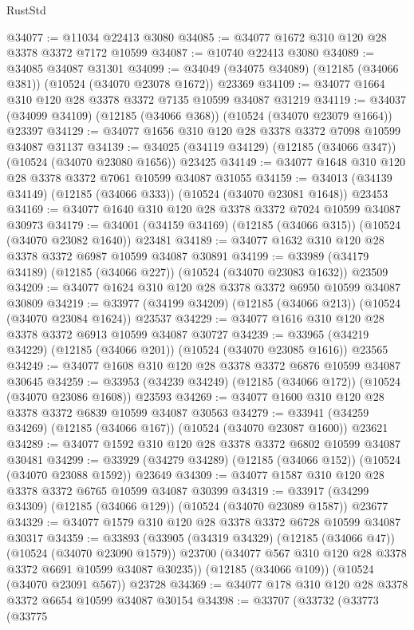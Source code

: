 \begin{lexlean}{RustStd}
\begin{coremodule}
@34077 := @11034 @22413 @3080
@34085 := @34077 @1672 @310 @120 @28 @3378 @3372 @7172 @10599
@34087 := @10740 @22413 @3080
@34089 := @34085 @34087 @31301
@34099 := @34049 (@34075 @34089) (@12185 (@34066 @381)) (@10524 (@34070 @23078 @1672)) @23369
@34109 := @34077 @1664 @310 @120 @28 @3378 @3372 @7135 @10599 @34087 @31219
@34119 := @34037 (@34099 @34109) (@12185 (@34066 @368)) (@10524 (@34070 @23079 @1664)) @23397
@34129 := @34077 @1656 @310 @120 @28 @3378 @3372 @7098 @10599 @34087 @31137
@34139 := @34025 (@34119 @34129) (@12185 (@34066 @347)) (@10524 (@34070 @23080 @1656)) @23425
@34149 := @34077 @1648 @310 @120 @28 @3378 @3372 @7061 @10599 @34087 @31055
@34159 := @34013 (@34139 @34149) (@12185 (@34066 @333)) (@10524 (@34070 @23081 @1648)) @23453
@34169 := @34077 @1640 @310 @120 @28 @3378 @3372 @7024 @10599 @34087 @30973
@34179 := @34001 (@34159 @34169) (@12185 (@34066 @315)) (@10524 (@34070 @23082 @1640)) @23481
@34189 := @34077 @1632 @310 @120 @28 @3378 @3372 @6987 @10599 @34087 @30891
@34199 := @33989 (@34179 @34189) (@12185 (@34066 @227)) (@10524 (@34070 @23083 @1632)) @23509
@34209 := @34077 @1624 @310 @120 @28 @3378 @3372 @6950 @10599 @34087 @30809
@34219 := @33977 (@34199 @34209) (@12185 (@34066 @213)) (@10524 (@34070 @23084 @1624)) @23537
@34229 := @34077 @1616 @310 @120 @28 @3378 @3372 @6913 @10599 @34087 @30727
@34239 := @33965 (@34219 @34229) (@12185 (@34066 @201)) (@10524 (@34070 @23085 @1616)) @23565
@34249 := @34077 @1608 @310 @120 @28 @3378 @3372 @6876 @10599 @34087 @30645
@34259 := @33953 (@34239 @34249) (@12185 (@34066 @172)) (@10524 (@34070 @23086 @1608)) @23593
@34269 := @34077 @1600 @310 @120 @28 @3378 @3372 @6839 @10599 @34087 @30563
@34279 := @33941 (@34259 @34269) (@12185 (@34066 @167)) (@10524 (@34070 @23087 @1600)) @23621
@34289 := @34077 @1592 @310 @120 @28 @3378 @3372 @6802 @10599 @34087 @30481
@34299 := @33929 (@34279 @34289) (@12185 (@34066 @152)) (@10524 (@34070 @23088 @1592)) @23649
@34309 := @34077 @1587 @310 @120 @28 @3378 @3372 @6765 @10599 @34087 @30399
@34319 := @33917 (@34299 @34309) (@12185 (@34066 @129)) (@10524 (@34070 @23089 @1587)) @23677
@34329 := @34077 @1579 @310 @120 @28 @3378 @3372 @6728 @10599 @34087 @30317
@34359 := @33893
    (@33905
      (@34319 @34329)
      (@12185 (@34066 @47))
      (@10524 (@34070 @23090 @1579))
      @23700
      (@34077 @567 @310 @120 @28 @3378 @3372 @6691 @10599 @34087 @30235))
    (@12185 (@34066 @109))
    (@10524 (@34070 @23091 @567))
    @23728
@34369 := @34077 @178 @310 @120 @28 @3378 @3372 @6654 @10599 @34087 @30154
@34398 := @33707
    (@33732
      (@33773
        (@33775

\end{coremodule}
\end{lexlean}
